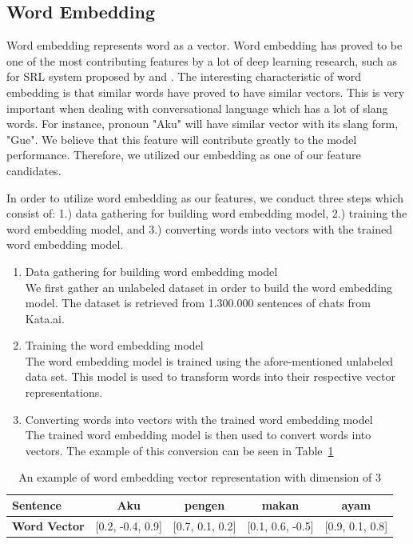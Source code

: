 \subsection{Word Embedding}
Word embedding represents word as a vector. Word embedding has proved to be one of the most contributing features by a lot of deep learning research, such as for SRL system proposed by \cite{zhou2015end} and \cite{collobert2011natural}. The interesting characteristic of word embedding is that similar words have proved to have similar vectors. This is very important when dealing with conversational language which has a lot of slang words. For instance, pronoun "Aku" will have similar vector with its slang form, "Gue". We believe that this feature will contribute greatly to the model performance. Therefore, we utilized our embedding as one of our feature candidates.

In order to utilize word embedding as our features, we conduct three steps which consist of: 1.) data gathering for building word embedding model, 2.) training the word embedding model, and 3.) converting words into vectors with the trained word embedding model.

\begin{enumerate}
	\item Data gathering for building word embedding model\\
	We first gather an unlabeled dataset in order to build the word embedding model. The dataset is retrieved from 1.300.000 sentences of chats from Kata.ai.
	
	\item Training the word embedding model\\
	The word embedding model is trained using the afore-mentioned unlabeled data set. This model is used to transform words into their respective vector representations.
	
	\item Converting words into vectors with the trained word embedding model\\
	The trained word embedding model is then used to convert words into vectors. The example of this conversion can be seen in Table~\ref{tab:examplewe}
\end{enumerate}

\begin{table}
	\centering
	\caption{An example of word embedding vector representation with dimension of 3}
	\label{tab:examplewe}
	\begin{tabular}{|lcccc|}
		\hline
		\textbf{Sentence} 				& Aku & pengen & makan & ayam \\
		\hline
		\textbf{Word Vector}		& [0.2, -0.4, 0.9] & [0.7, 0.1, 0.2] & [0.1, 0.6, -0.5] & [0.9, 0.1, 0.8] \\
		\hline
	\end{tabular}
\end{table}

